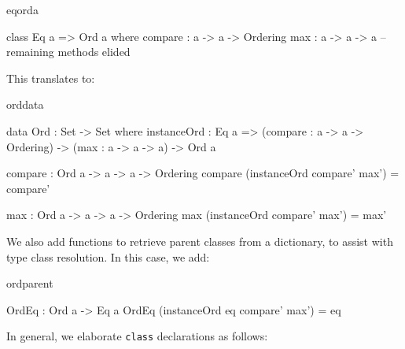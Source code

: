 \begin{SaveVerbatim}{eqorda}

class Eq a => Ord a where
    compare : a -> a -> Ordering
    max : a -> a -> a
    -- remaining methods elided

\end{SaveVerbatim}

\noindent
This translates to:

\begin{SaveVerbatim}{orddata}

data Ord : Set -> Set where
    instanceOrd : Eq a => (compare : a -> a -> Ordering) -> 
                          (max : a -> a -> a) ->  Ord a 

compare : Ord a -> a -> a -> Ordering
compare (instanceOrd compare' max') = compare'

max : Ord a -> a -> a -> Ordering
max (instanceOrd compare' max') = max'

\end{SaveVerbatim}

We also add functions to retrieve parent classes from a dictionary, to assist
with type class resolution. In this case, we add:

\begin{SaveVerbatim}{ordparent}

OrdEq : Ord a -> Eq a
OrdEq (instanceOrd {{eq}} compare' max') = eq

\end{SaveVerbatim}

\noindent
In general, we elaborate \texttt{class} declarations as follows:




